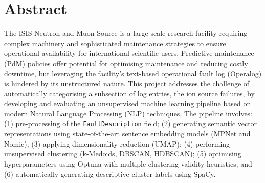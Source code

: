 \documentclass[10pt,oneside]{report}
\begin{document}

\clearpage


\chapter*{Abstract}

The ISIS Neutron and Muon Source is a large-scale research facility requiring complex machinery and sophisticated maintenance strategies to ensure operational availability for international scientific users. Predictive maintenance (PdM) policies offer potential for optimising maintenance and reducing costly downtime, but leveraging the facility's text-based operational fault log (Operalog) is hindered by its unstructured nature. This project addresses the challenge of automatically categorising a subsection of log entries, the ion source failures, by developing and evaluating an unsupervised machine learning pipeline based on modern Natural Language Processing (NLP) techniques. The pipeline involves: (1) pre-processing of the \texttt{FaultDescription} field; (2) generating semantic vector representations using state-of-the-art sentence embedding models (MPNet and Nomic); (3) applying dimensionality reduction (UMAP); (4) performing unsupervised clustering (k-Medoids, DBSCAN, HDBSCAN); (5) optimising hyperparameters using Optuna with multiple clustering validity heuristics; and (6) automatically generating descriptive cluster labels using SpaCy. 
\end{document}
